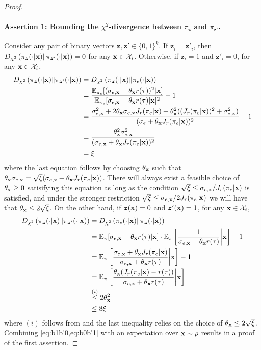 \begin{proof}
\paragraph{Assertion 1: Bounding the $\chi^2$-divergence between $\pi_{\bm{z}}$ and $\pi_{\bm{z}'}$.} Consider any pair of binary vectors $\bm{z},\bm{z}' \in \{ 0,1 \}^k$. If $\bm{z}_i = \bm{z}'_i$, then $D_{\chi^2} \left( \pi_{\bm{z}} (\cdot|\mathbf{x}) \| \pi_{\bm{z}'} (\cdot|\mathbf{x}) \right) = 0$ for any $\mathbf{x} \in \mathcal{X}_i$. Otherwise, if $\bm{z}_i = 1$ and $\bm{z}'_i = 0$, for any $\mathbf{x} \in \mathcal{X}_i$,
\begin{align}
    D_{\chi^2} \left( \pi_{\bm{z}} (\cdot|\mathbf{x}) \| \pi_{\bm{z}'} (\cdot|\mathbf{x}) \right) &= D_{\chi^2} \left( \pi_{\bm{z}} (\cdot|\mathbf{x}) \| \pi_e(\cdot|\mathbf{x}) \right) \nonumber\\
    &= \frac{\mathbb{E}_{\pi_e} [(\sigma_{e,\mathbf{x}} + \theta_{\mathbf{x}} r(\tau))^2 | \mathbf{x} ]}{\mathbb{E}_{\pi_e} [\sigma_{e,\mathbf{x}} + \theta_{\mathbf{x}} r(\tau) | \mathbf{x} ]^2} - 1 \nonumber\\
    &= \frac{\sigma_{e,\mathbf{x}}^2 + 2 \theta_{\mathbf{x}} \sigma_{e,\mathbf{x}} J_r (\pi_e | \mathbf{x}) + \theta_{\mathbf{x}}^2 ((J_r (\pi_e | \mathbf{x}))^2 + \sigma_{e,\mathbf{x}}^2)}{(\sigma_e + \theta_{\mathbf{x}} J_r(\pi_e | \mathbf{x}))^2} - 1 \nonumber\\
    &= \frac{\theta_{\mathbf{x}}^2 \sigma_{e,\mathbf{x}}^2}{(\sigma_{e,\mathbf{x}} + \theta_{\mathbf{x}} J_r(\pi_e | \mathbf{x}))^2} \nonumber\\
    &= \xi \label{eq:b1b'0}
\end{align}
where the last equation follows by choosing $\theta_{\mathbf{x}}$ such that $\theta_{\mathbf{x}} \sigma_{e,\mathbf{x}} = \sqrt{\xi} (\sigma_{e,\mathbf{x}} + \theta_{\mathbf{x}} J_r(\pi_e | \mathbf{x}))$. There will always exist a feasible choice of $\theta_{\mathbf{x}} \ge 0$ satisifying this equation as long as the condition $\sqrt{\xi} \le \sigma_{e,\mathbf{x}} / J_r (\pi_e | \mathbf{x})$ is satisfied, and under the stronger restriction $\sqrt{\xi} \le \sigma_{e,\mathbf{x}} / 2 J_r (\pi_e | \mathbf{x})$ we will have that $\theta_{\mathbf{x}} \le 2\sqrt{\xi}$. On the other hand, if $\bm{z} (\mathbf{x}) = 0$ and $\bm{z}' (\mathbf{x}) = 1$, for any $\mathbf{x} \in \mathcal{X}_i$,
\begin{align}
    D_{\chi^2} \left( \pi_{\bm{z}} (\cdot|\mathbf{x}) \| \pi_{\bm{z}'} (\cdot|\mathbf{x}) \right) &= D_{\chi^2} \left( \pi_e(\cdot|\mathbf{x}) \| \pi_{\bm{z}} (\cdot|\mathbf{x}) \right) \nonumber\\
    &= \mathbb{E}_{\pi} [\sigma_{e,\mathbf{x}} + \theta_{\mathbf{x}} r(\tau) | \mathbf{x} ] \cdot \mathbb{E}_{\pi} \left[ \frac{1}{\sigma_{e,\mathbf{x}} + \theta_{\mathbf{x}} r(\tau)} \middle| \mathbf{x} \right] - 1 \nonumber\\
    &= \mathbb{E}_{\pi} \left[ \frac{\sigma_{e,\mathbf{x}} + \theta_{\mathbf{x}} J_r(\pi_e | \mathbf{x})}{\sigma_{e,\mathbf{x}} + \theta_{\mathbf{x}} r(\tau)} \middle| \mathbf{x} \right] - 1 \nonumber\\
    &= \mathbb{E}_{\pi} \left[ \frac{\theta_{\mathbf{x}} ( J_r(\pi_e | \mathbf{x}) - r(\tau))}{\sigma_{e,\mathbf{x}} + \theta_{\mathbf{x}} r(\tau)} \middle| \mathbf{x} \right] \nonumber\\
    &\overset{(i)}{\le} 2 \theta_{\mathbf{x}}^2 \nonumber\\
    &\le 8 \xi \label{eq:b0b'1}
\end{align}
where $(i)$ follows from  and the last inequality relies on the choice of $\theta_{\mathbf{x}} \le 2 \sqrt{\xi}$. Combining \cref{eq:b1b'0,eq:b0b'1} with an expectation over $\mathbf{x} \sim \rho$ results in a proof of the first assertion.


\end{proof}
